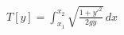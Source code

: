 \documentclass[preview]{standalone}
\begin{document}
\begin{align*}
T[y] = \int_{x_1}^{x_2} \sqrt{\frac{1 + y'^2}{2gy}} \, dx
\end{align*}
\end{document}
